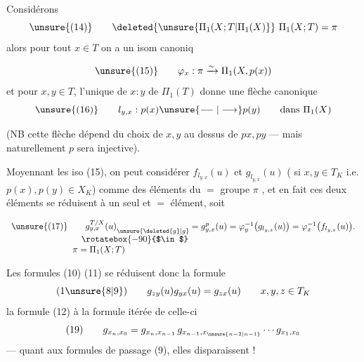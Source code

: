 Considérons 
\[
\unsure{(14)}\qquad \deleted{\unsure{\Pi_1(X;T|\Pi_1(X)}}\ \Pi_1(X;T)=\pi
\]
alors pour tout $x\in T$ on a un isom canoniq

\[
\unsure{(15)}\qquad\varphi_x:\pi\xrightarrow{\sim}\Pi_1(X,p(x))
\]
et pour $x,y\in T$, l'unique   de  $x:y$ de $\Pi_1(T)$ donne  une flèche canonique
\[
\unsure{(16)}\qquad l_{y,x}:p(x)\unsure{\relbar\joinrel\relbar|\longrightarrow}p(y)\qquad\text{dans }\Pi_1(X)
\]

(NB cette flèche dépend du choix de $x,y$ au dessus de $px,py$ --- mais naturellement $p$ sera injective).

Moyennant les iso (15), on peut considérer $f_{l_{y,x}}(u)$ et $g_{l_{y,x}}(u)$ ( si $x,y\in T_K$ i.e. $p(x),p(y)\in X_K$) comme des éléments du $=$ groupe $\pi$ ,  et en fait ces deux éléments se réduisent à un seul et $=$ élément, soit

\[
\begin{array}{l}
\unsure{(17)}\qquad g_{y,x}^{T/X}(u)\raisebox{-1ex}{$\scriptstyle\unsure{\deleted{g}|g}$}=g_{y,x}^{p}(u)=\varphi_y^{-1}\bigl(g_{l_{y,x}}(u)\bigr)=\varphi_x^{-1}\bigl(f_{l_{y,x}}(u)\bigr).\\
\hspace{8em}\rotatebox{-90}{$\in$}\\
\hspace{7em}\pi=\Pi_1(X;T)
\end{array}
\]


Les formules (10) (11) se réduisent donc  la formule
\[
(1\unsure{8|9})\qquad g_{zy}(u)g_{yx}(u)=g_{zx}(u)\qquad x,y,z\in T_K
\]
la formule (12) à la formule itérée de celle-ci
\[
(19)\qquad g_{x_n,x_0}=g_{x_n,x_{n-1}}\,g_{x_{n-1},x_{\unsure{n-2|n-1}}}\cdots g_{x_1,x_0}
\]
--- quant aux formules de passage (9), elles  disparaissent !

